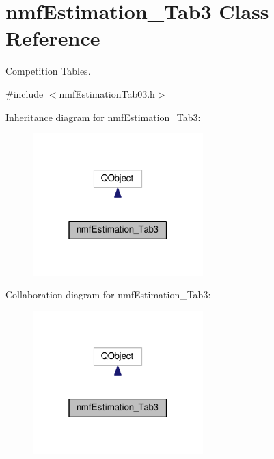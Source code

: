 \hypertarget{classnmf_estimation___tab3}{}\section{nmf\+Estimation\+\_\+\+Tab3 Class Reference}
\label{classnmf_estimation___tab3}


Competition Tables.  




{\ttfamily \#include $<$nmf\+Estimation\+Tab03.\+h$>$}



Inheritance diagram for nmf\+Estimation\+\_\+\+Tab3\+:\nopagebreak
\begin{figure}[H]
\begin{center}
\leavevmode
\includegraphics[width=187pt]{classnmf_estimation___tab3__inherit__graph}
\end{center}
\end{figure}


Collaboration diagram for nmf\+Estimation\+\_\+\+Tab3\+:\nopagebreak
\begin{figure}[H]
\begin{center}
\leavevmode
\includegraphics[width=187pt]{classnmf_estimation___tab3__coll__graph}
\end{center}
\end{figure}
